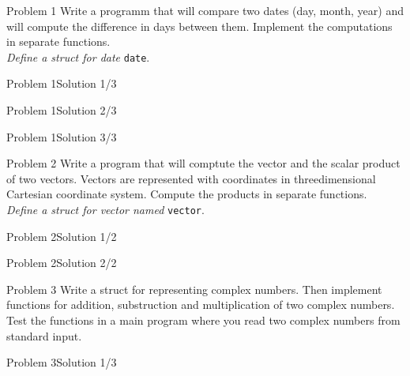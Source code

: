 
\begin{frame}{Problem 1}
Write a programm that will compare two dates (day, month, year) and will compute
the difference in days between them. Implement the computations in separate
functions.\\
\emph{Define a struct for date} \texttt{date}.
\end{frame}

\begin{frame}[fragile]{Problem 1}{Solution 1/3}

\end{frame}

\begin{frame}[fragile]{Problem 1}{Solution 2/3}

\end{frame}

\begin{frame}[fragile]{Problem 1}{Solution 3/3}

\end{frame}

\begin{frame}{Problem 2}
Write a program that will comptute the vector and the scalar product of two
vectors. Vectors are represented with coordinates in threedimensional
Cartesian coordinate system. Compute the products in separate functions.\\
\emph{Define a struct for vector named} \texttt{vector}.
\end{frame}

\begin{frame}[fragile]{Problem 2}{Solution 1/2}

\end{frame}

\begin{frame}[fragile]{Problem 2}{Solution 2/2}

\end{frame}

\begin{frame}{Problem 3}
Write a struct for representing complex numbers. Then implement functions for
addition, substruction and multiplication of two complex numbers. Test the
functions in a main program where you read two complex numbers from standard
input.
\end{frame}

\begin{frame}[fragile]{Problem 3}{Solution 1/3}

\end{frame}

